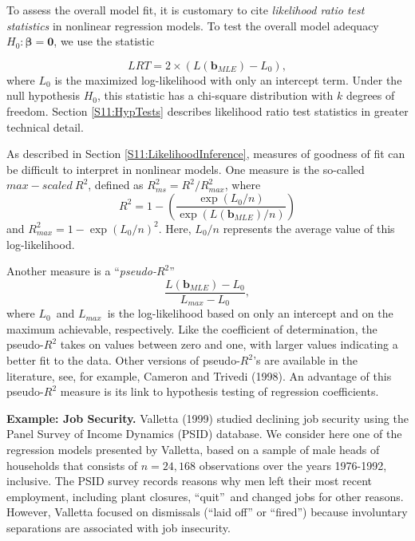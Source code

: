 To assess the overall model fit, it is customary to cite
\emph{likelihood ratio test statistics} in nonlinear regression
models. To test the overall model adequacy $H_0:\boldsymbol
\beta=\mathbf{0}$, we use the statistic

\begin{equation*}
LRT=2\times (L(\mathbf{b}_{MLE})-L_0),
\end{equation*}
where $L_0$ is the maximized log-likelihood with only an intercept
term. Under the null hypothesis $H_0$, this statistic has a
chi-square distribution with $k$ degrees of freedom. Section
\ref{S11:HypTests} describes likelihood ratio test statistics in
greater technical detail.

As described in Section \ref{S11:LikelihoodInference}, measures of
goodness of fit can be difficult to interpret in nonlinear models.
One measure is the so-called $max-scaled~R^2$, defined as
$R_{ms}^2=R^2/R_{max}^2$, where
\begin{equation*}
R^2=1-\left( \frac{\exp (L_0/n)}{\exp
(L(\mathbf{b}_{MLE})/n)}\right)
\end{equation*}
and $R_{max }^2 = 1 - \exp(L_0/n)^2$. Here, $L_0/n$ represents the
average value of this log-likelihood.

Another measure is a ``\emph{pseudo-}$R^2$''
\begin{equation*}
\frac{L( \mathbf{b}_{MLE}) - L_0}{L_{max}-L_0},
\end{equation*}
where $L_0$\ and $L_{max }$\ is the log-likelihood based on only an
intercept and on the maximum achievable, respectively. Like the
coefficient of determination, the pseudo-$R^2$ takes on values
between zero and one, with larger values indicating a better fit to
the data. Other versions of pseudo-$R^2$'s are available in the
literature, see, for example, Cameron and Trivedi (1998). An
advantage of this pseudo-$R^2$ measure is its link to hypothesis
testing of regression coefficients.


\linejed{}

\textbf{Example: Job Security.} Valletta
(1999) studied declining job security using the Panel Survey of
Income Dynamics (PSID) database. We consider here one of the
regression models presented by Valletta, based on a sample of male
heads of households that consists of $n=24,168$ observations over the
years 1976-1992, inclusive. The PSID survey records reasons why men
left their most recent employment, including plant closures,
\textquotedblleft quit\textquotedblright\ and changed jobs for other
reasons. However, Valletta focused on dismissals (``laid off'' or
``fired'') because involuntary separations are associated with job
insecurity.

